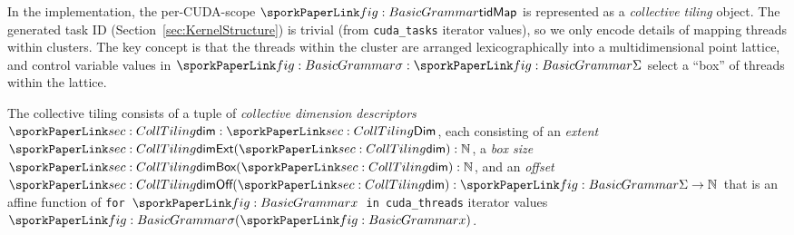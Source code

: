 

In the implementation, the per-CUDA-scope $\sporktidMap$ is represented as a \emph{collective tiling} object.
The generated task ID (Section~\ref{sec:KernelStructure}) is trivial (from \texttt{cuda\_tasks} iterator values),
so we only encode details of mapping threads within clusters.
The key concept is that the threads within the cluster are arranged lexicographically into a multidimensional point lattice,
and control variable values in $\sporksigma:\sporkSigma$ select a ``box'' of threads within the lattice.

The collective tiling consists of a tuple of \emph{collective dimension descriptors} $\sporkdim: \sporkDim$,
each consisting of an \emph{extent} $\sporkdimExt(\sporkdim): \mathbb{N}$,
a \emph{box size} $\sporkdimBox(\sporkdim): \mathbb{N}$,
and an \emph{offset} $\sporkdimOff(\sporkdim): \sporkSigma \to \mathbb{N}$ that is an affine function of \texttt{for $\sporkx$ in cuda\_threads} iterator values $\sporksigma(\sporkx)$.

